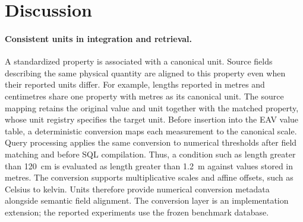 \section{Discussion}
\label{sec:unit_discussion}
\paragraph{Consistent units in integration and retrieval.}
A standardized property is associated with a canonical unit. Source fields describing the same physical quantity are aligned to this property even when their reported units differ. For example, lengths reported in metres and centimetres share one property with metres as its canonical unit. The source mapping retains the original value and unit together with the matched property, whose unit registry specifies the target unit. Before insertion into the EAV value table, a deterministic conversion maps each measurement to the canonical scale. Query processing applies the same conversion to numerical thresholds after field matching and before SQL compilation. Thus, a condition such as length greater than 120~cm is evaluated as length greater than 1.2~m against values stored in metres. The conversion supports multiplicative scales and affine offsets, such as Celsius to kelvin. Units therefore provide numerical conversion metadata alongside semantic field alignment. The conversion layer is an implementation extension; the reported experiments use the frozen benchmark database.
